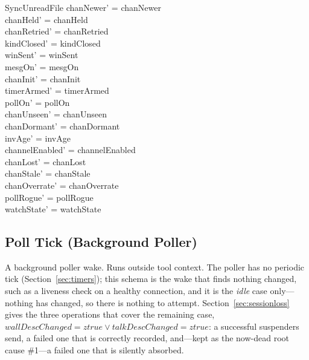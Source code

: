 \documentclass[a4paper,10pt,fleqn]{article}
\begin{document}
\begin{schema}{SyncUnreadFile}
  chanNewer' = chanNewer \\
  chanHeld' = chanHeld \\
  chanRetried' = chanRetried \\
  kindClosed' = kindClosed \\
  winSent' = winSent \\
  mesgOn' = mesgOn \\
  chanInit' = chanInit \\
  timerArmed' = timerArmed \\
  pollOn' = pollOn \\
  chanUnseen' = chanUnseen \\
  chanDormant' = chanDormant \\
  invAge' = invAge \\
  channelEnabled' = channelEnabled \\
  chanLost' = chanLost \\
  chanStale' = chanStale \\
  chanOverrate' = chanOverrate \\
  pollRogue' = pollRogue \\
  watchState' = watchState
\end{schema}

\subsection{Poll Tick (Background Poller)}
\label{sec:polltick}

A background poller wake.  Runs outside tool context.  The poller has no
periodic tick (Section~\ref{sec:timers}); this schema is the wake that finds
nothing changed, such as a liveness check on a healthy connection, and it is
the \emph{idle} case only---nothing has changed, so there is
nothing to attempt.  Section~\ref{sec:sessionloss} gives the three
operations that cover the remaining case, $wallDescChanged = ztrue \lor
talkDescChanged = ztrue$: a successful suspenders send, a failed one
that is correctly recorded, and---kept as the now-dead root cause
\#1---a failed one that is silently absorbed.
\end{document}
